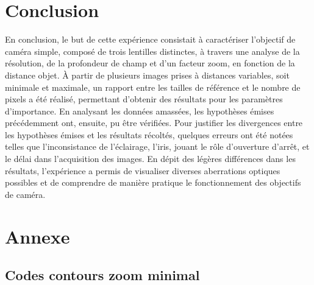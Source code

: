 \documentclass[11pt,letterpaper]{article}
\begin{document}
\section{Conclusion}
En conclusion, le but de cette expérience consistait à caractériser l'objectif de caméra simple, composé de trois lentilles distinctes, à travers une analyse de la résolution, de la profondeur de champ et d'un facteur zoom, en fonction de la distance objet. À partir de plusieurs images prises à distances variables, soit minimale et maximale, un rapport entre les tailles de référence et le nombre de pixels a été réalisé, permettant d'obtenir des résultats pour les paramètres d'importance. En analysant les données amassées, les hypothèses émises précédemment ont, ensuite, pu être vérifiées. Pour justifier les divergences entre les hypothèses émises et les résultats récoltés, quelques erreurs ont été notées telles que l'inconsistance de l'éclairage, l'iris, jouant le rôle d'ouverture d'arrêt, et le délai dans l'acquisition des images. En dépit des légères différences dans les résultats, l'expérience a permis de visualiser diverses aberrations optiques possibles et de comprendre de manière pratique le fonctionnement des objectifs de caméra.

\clearpage
\section{Annexe}
\subsection{Codes contours zoom minimal}
\end{document}

